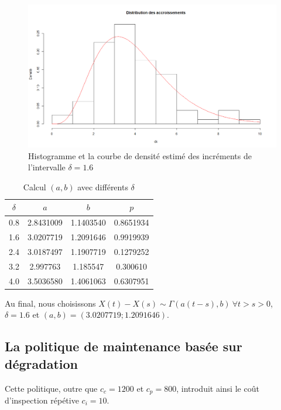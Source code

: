 \documentclass[10pt,a4paper]{article}
\begin{document}
\begin{figure}[!h]
    \centering
    \includegraphics[width=\textwidth]{img/histo_dens_degrad_1_6.png}
    \caption{Histogramme et la courbe de densité estimé des incréments de l'intervalle $\delta = 1.6$}
    \label{fig:histo_dens_degrad_1_6}
\end{figure}

\begin{table}[!h]
    \centering
    \begin{tabular}{|c|c|c|c|}
        \hline
        $\delta$ & $a$ & $b$ & $p$ \\
        \hline
        0.8 & 2.8431009 & 1.1403540 & 0.8651934\\
        1.6 & 3.0207719 & 1.2091646 & 0.9919939\\
        2.4 & 3.0187497 & 1.1907719 & 0.1279252\\
        3.2 & 2.997763 & 1.185547 & 0.300610\\
        4.0 & 3.5036580 & 1.4061063 & 0.6307951\\
        \hline
    \end{tabular}
    \caption{Calcul $(a,b)$ avec différents $\delta$}
\end{table}

Au final, nous choisissons $X(t) - X(s) \sim \Gamma(a(t-s),b)\  \forall t > s > 0$, $\delta=1.6$ et $(a,b) = (3.0207719;1.2091646)$.

\subsection{La politique de maintenance basée sur dégradation}

Cette politique, outre que $c_c=1200$ et $c_p=800$, introduit ainsi le coût d'inspection répétive $c_i = 10$.
\end{document}
